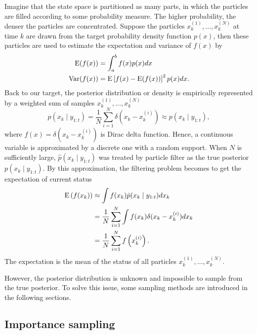Imagine that the state space is partitioned as many parts, in which the particles are filled according to some probability measure. The higher probability, the denser the particles are concentrated. Suppose the particles $x_k^{(1)}, \ldots, x_k^{(N)}$ at time $k$ are drawn from the target probability density function $p(x)$, then these particles are used to estimate the expectation and variance of $f(x)$ by
\begin{align*}
\mathrm{E}(f(x)) &= \int_a^bf(x)p(x)dx\\
\mathrm{Var}(f(x)) &= \mathrm{E}\left[ f(x)-\mathrm{E}(f(x)) \right]^2p(x)dx.
\end{align*}
Back to our target, the posterior distribution or density is empirically represented by a weighted sum of samples $x_k^{(1)}, \ldots, x_k^{(N)}$  
\begin{equation}\label{rawParticleFilter}
\hat{p}(x_k\mid y_{1:t})=\frac{1}{N}\sum_{i=1}^N\delta \left(x_k-x_k^{(i)}\right)\approx p(x_k\mid y_{1:t}),
\end{equation}
where $f(x)=\delta (x_k-x_k^{(i)})$ is Dirac delta function. Hence, a continuous variable is approximated by a discrete one with a random support. When $N$ is sufficiently large, $\hat{p}(x_k\mid y_{1:t})$ was treated by particle filter as the true posterior $p(x_k\mid y_{1:t})$. By this approximation, the filtering problem becomes to get the expectation of current status 
\begin{align*}
\mathrm{E}\left(f(x_k)\right) &\approx \int f(x_k)\hat{p}(x_k\mid y_{1:t})dx_k \\
 & =\frac{1}{N} \sum_{i=1}^N\int f(x_k) \delta (x_k-x_k^{(i)}) dx_k\\
 & = \frac{1}{N}\sum_{i=1}^Nf\left(x_k^{(i)}\right).
\end{align*}
The expectation is the mean of the status of all particles $x_k^{(1)}, \ldots, x_k^{(N)}$.  

However, the posterior distribution is unknown and impossible to sample from the true posterior. To solve this issue, some sampling methods are introduced in the following sections.


\subsection{Importance sampling}


